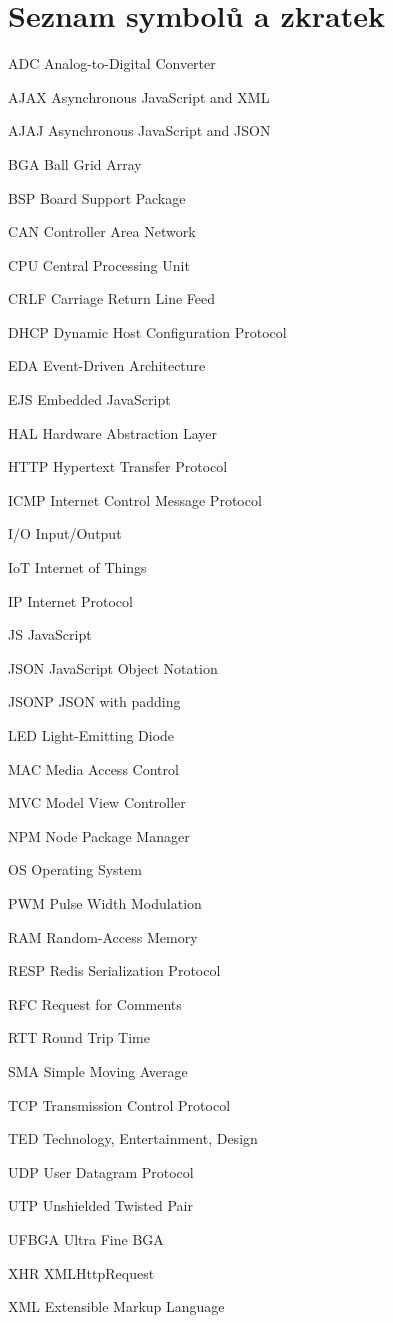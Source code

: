 \documentclass[oneside,12pt,a4paper,draft]{book} %
\makeatletter
\newcommand{\tocfill}{\cleaders\hbox{$\m@th \mkern\@dotsep mu . \mkern\@dotsep mu$}\hfill}
\newcommand{\abbrlabel}[1]{\makebox[6cm][l]{\textbf{#1}\ \tocfill}}
\newenvironment{abbreviations}{\begin{list}{}{\renewcommand{\makelabel}{\abbrlabel}%
        \setlength{\labelwidth}{6cm}\setlength{\leftmargin}{\labelwidth+\labelsep}%
                                              \setlength{\itemsep}{0pt}}}{\end{list}}
\makeatother
\begin{document}
\chapter*{Seznam symbolů a zkratek}
\noindent
\begin{abbreviations}
\item[ADC]		Analog-to-Digital Converter
\item[AJAX]		Asynchronous JavaScript and XML
\item[AJAJ]		Asynchronous JavaScript and JSON
\item[BGA]		Ball Grid Array
\item[BSP]		Board Support Package
\item[CAN]		Controller Area Network
\item[CPU]		Central Processing Unit
\item[CRLF]		Carriage Return Line Feed
\item[DHCP]		Dynamic Host Configuration Protocol
\item[EDA]		Event-Driven Architecture
\item[EJS]		Embedded JavaScript
\item[HAL]		Hardware Abstraction Layer
\item[HTTP]		Hypertext Transfer Protocol
\item[ICMP]		Internet Control Message Protocol
\item[I/O]		Input/Output
\item[IoT]		Internet of Things
\item[IP]		Internet Protocol
\item[JS]		JavaScript
\item[JSON]		JavaScript Object Notation
\item[JSONP]	JSON with padding
\item[LED]		Light-Emitting Diode
\item[MAC]		Media Access Control
\item[MVC]		Model View Controller
\item[NPM]		Node Package Manager
\item[OS]		Operating System
\item[PWM]		Pulse Width Modulation
\item[RAM]		Random-Access Memory
\item[RESP]		Redis Serialization Protocol
\item[RFC]		Request for Comments
\item[RTT]		Round Trip Time
\item[SMA]		Simple Moving Average
\item[TCP]		Transmission Control Protocol
\item[TED]		Technology, Entertainment, Design
\item[UDP]		User Datagram Protocol
\item[UTP]		Unshielded Twisted Pair
\item[UFBGA]	Ultra Fine BGA
\item[XHR]		XMLHttpRequest
\item[XML]		Extensible Markup Language
\end{abbreviations}
\end{document}
